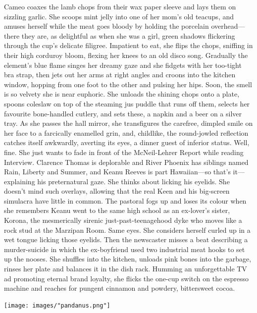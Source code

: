 \documentclass[
]{memoir}
\begin{document}
Cameo coaxes the lamb chops from their wax paper sleeve and lays them on
sizzling garlic. She scoops mint jelly into one of her mom's old
teacups, and amuses herself while the meat goes bloody by holding the
porcelain overhead---there they are, as delightful as when she was a
girl, green shadows flickering through the cup's delicate filigree.
Impatient to eat, she flips the chops, sniffing in their high corduroy
bloom, flexing her knees to an old disco song. Gradually the element's
blue flame singes her dreamy gaze and she fidgets with her too-tight bra
strap, then jets out her arms at right angles and croons into the
kitchen window, hopping from one foot to the other and pulsing her hips.
Soon, the smell is so velvety she is near euphoric. She unloads the
shining chops onto a plate, spoons coleslaw on top of the steaming jus
puddle that runs off them, selects her favourite bone-handled cutlery,
and sets these, a napkin and a beer on a silver tray. As she passes the
hall mirror, she transfigures the carefree, dimpled smile on her face to
a farcically enamelled grin, and, childlike, the round-jowled reflection
catches itself awkwardly, averting its eyes, a dinner guest of inferior
status. Well, fine. She just wants to fade in front of the McNeil-Lehrer
Report while reading Interview. Clarence Thomas is deplorable and River
Phoenix has siblings named Rain, Liberty and Summer, and Keanu Reeves is
part Hawaiian---so that's it---explaining his preternatural gaze. She
thinks about licking his eyelids. She doesn't mind such overlays,
allowing that the real Keen and his big-screen simulacra have little in
common. The pastoral fogs up and loses its colour when she remembers
Keanu went to the same high school as an ex-lover's sister, Korona, the
mesmerically sirenic just-past-teenagehood dyke who moves like a rock
stud at the Marzipan Room. Same eyes. She considers herself curled up in
a wet tongue licking those eyelids. Then the newscaster misses a beat
describing a murder-suicide in which the ex-boyfriend used two
industrial meat hooks to set up the nooses. She shuffles into the
kitchen, unloads pink bones into the garbage, rinses her plate and
balances it in the dish rack. Humming an unforgettable TV ad promoting
eternal brand loyalty, she flicks the one-cup switch on the espresso
machine and reaches for pungent cinnamon and powdery, bittersweet cocoa.

\begin{center}\texttt{[image: images/"pandanus.png"]}\end{center}
\end{document}
